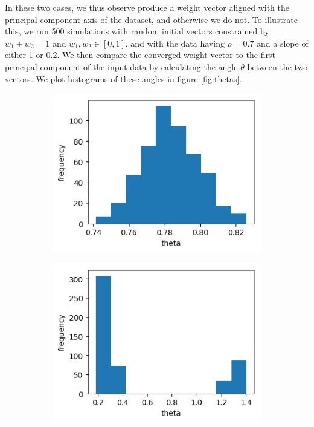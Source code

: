 \documentclass{article}
\begin{document}
In these two cases, we thus observe produce a weight vector aligned with the principal component axis of the dataset, and otherwise we do not.
To illustrate this, we run 500 simulations with random initial vectors constrained by $w_1 + w_2 = 1$ and $w_1, w_2 \in [0,1]$, and with the data having $\rho = 0.7$ and a slope of either 1 or 0.2. We then compare the converged weight vector to the first principal component of the input data by calculating the angle $\theta$ between the two vectors. We plot histograms of these angles in figure \ref{fig:thetas}.

\begin{figure}[h]
	\centering
	\begin{subfigure}[t]{0.30\linewidth}
		\centering
		\includegraphics[width = 1.0\linewidth, trim={0 0 0 0}, clip=true]{figures/rho7_slope1_hist.png}
		\subcaption{}
		\label{}	
	\end{subfigure}%
	\hspace{0.1\linewidth}
	\begin{subfigure}[t]{0.30\linewidth}
		\centering
		\includegraphics[width = 1.0\linewidth, trim={0 0 0 0}, clip=true]{figures/rho7_slope02_hist.png}

\end{subfigure}
\end{figure}
\end{document}
